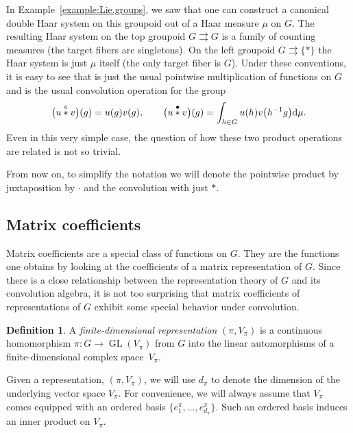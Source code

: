 \documentclass[pdftex]{sigma}
\numberwithin{equation}{section}
\theoremstyle{definition}
\newtheorem{Definition}[Theorem]{Definition}
\newcommand{\stardot}{\overset{{\bullet}}{*}}
\newcommand{\starcirc}{\overset{\circ}{*}}
\newcommand{\inv}{^{-1}}
\newcommand{\grpd}{\rightrightarrows}
\DeclareMathOperator{\GL}{GL}
\begin{document}
In Example~\ref{example:Lie.groups}, we saw that one can construct a canonical double Haar system on this groupoid out of a Haar measure $ \mu $ on $ G $. The resulting Haar system on the top groupoid $ G \grpd G $ is a family of counting measures (the target fibers are singletons). On the left groupoid $ G \grpd \{ * \} $ the Haar system is just $ \mu $ itself (the only target fiber is $ G $). Under these conventions, it is easy to see that \smash{$ \starcirc $} is just the usual pointwise multiplication of functions on $ G $ and \smash{$ \stardot $} is the usual convolution operation for the group
\[ \big(u \starcirc v\big) (g) = u(g) v(g), \qquad \big(u \stardot v \big) (g) = \int_{h \in G } u(h) v\big(h\inv g\big) {\rm d} \mu.\]
Even in this very simple case, the question of how these two product operations are related is not so trivial.

From now on, to simplify the notation we will denote the pointwise product \smash{$ \starcirc $} by juxtaposition by $ \cdot $ and the convolution \smash{$ \stardot $} with just $ * $.

\subsection{Matrix coefficients}\label{subsection:matrix.coefficients}

Matrix coefficients are a special class of functions on $ G $. They are the functions one obtains by looking at the coefficients of a matrix representation of $ G $. Since there is a close relationship between the representation theory of $ G $ and its convolution algebra, it is not too surprising that matrix coefficients of representations of $ G $ exhibit some special behavior under convolution.
\begin{Definition} A \textit{finite-dimensional representation} $(\pi,V_\pi)$ is a continuous homomorphism ${\pi\colon G\rightarrow \GL(V_\pi)}$ from $G$ into the linear automorphisms of a finite-dimensional complex space~$V_{\pi}$.
\end{Definition}
Given a representation, $ (\pi, V_\pi) $, we will use $ d_\pi $ to denote the dimension of the underlying vector space $ V_\pi $. For convenience, we will always assume that $ V_\pi $ comes equipped with an ordered basis $ \{ e^\pi_1, \ldots, e^\pi_{d_\pi} \} $. Such an ordered basis induces an inner product on $ V_\pi $.
\end{document}
